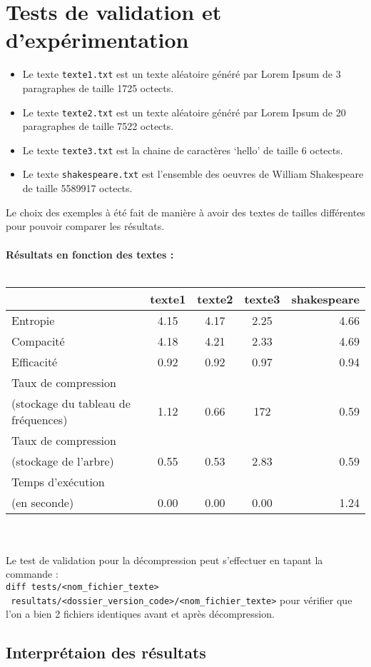 \documentclass[a4paper,11pt]{article}
\begin{document}
\section{Tests de validation et d'expérimentation} 
\begin{itemize}
\item Le texte \verb+texte1.txt+ est un texte aléatoire généré par Lorem Ipsum de 3 paragraphes de taille 1725 octects.
\item Le texte \verb+texte2.txt+ est un texte aléatoire généré par Lorem Ipsum de 20 paragraphes de taille 7522 octects.
\item Le texte \verb+texte3.txt+ est la chaine de caractères `hello' de taille 6 octects.
\item Le texte \verb+shakespeare.txt+ est l'ensemble des oeuvres de William Shakespeare de taille 5589917 octects.
\end{itemize}
Le choix des exemples à été fait de manière à avoir des textes de tailles différentes pour pouvoir comparer les résultats.\\\\
\vspace{5mm}
\textbf{ Résultats en fonction des textes :} \\\\
\begin{tabular}{|l|c|c|c|r|}
\hline
& texte1 & texte2 & texte3 & shakespeare \\
\hline
Entropie & 4.15 & 4.17 & 2.25 & 4.66 \\
\hline
Compacité & 4.18 & 4.21 & 2.33 & 4.69 \\
\hline
Efficacité & 0.92 & 0.92 & 0.97 & 0.94 \\
\hline
Taux de compression & & & & \\
(stockage du tableau de fréquences) & 1.12 & 0.66 & 172 & 0.59 \\
\hline
Taux de compression & & & & \\
(stockage de l'arbre) & 0.55  & 0.53  & 2.83  &  0.59\\
\hline
Temps d'exécution & & & &\\
(en seconde) & 0.00 & 0.00 & 0.00 & 1.24 \\
\hline
\end{tabular}
\\\\
Le test de validation pour la décompression peut s'effectuer en tapant la commande :\\
\verb+diff tests/<nom_fichier_texte>+\\
\verb+ resultats/<dossier_version_code>/<nom_fichier_texte>+ pour vérifier que l'on a bien 2 fichiers identiques avant et après décompression.
\subsection{Interprétaion des résultats}
\end{document}
